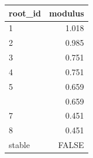 \begin{tabular}{lr}
\toprule
root\_id & modulus\\
\midrule
1 & 1.018\\
2 & 0.985\\
3 & 0.751\\
4 & 0.751\\
5 & 0.659\\
\addlinespace
6 & 0.659\\
7 & 0.451\\
8 & 0.451\\
stable & FALSE\\
\bottomrule
\end{tabular}
